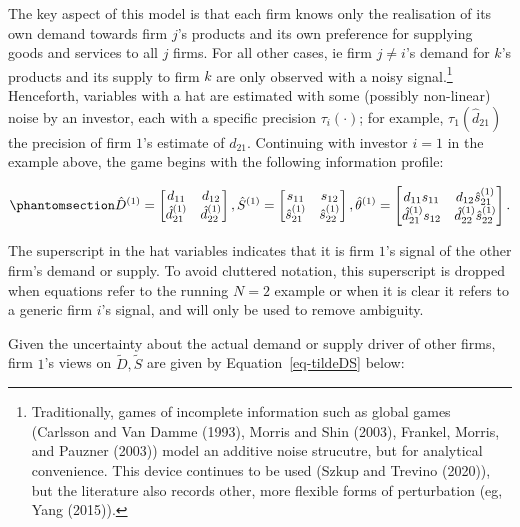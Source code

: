 \documentclass[
]{article}
\theoremstyle{definition}
\theoremstyle{plain}
\theoremstyle{remark}
\begin{document}
The key aspect of this model is that each firm knows only the
realisation of its own demand towards firm \(j\)'s products and its own
preference for supplying goods and services to all \(j\) firms. For all
other cases, ie firm \(j \neq i\)'s demand for \(k\)'s products and its
supply to firm \(k\) are only observed with a noisy signal.\footnote{Traditionally,
  games of incomplete information such as global games (Carlsson and Van
  Damme (1993), Morris and Shin (2003), Frankel, Morris, and Pauzner
  (2003)) model an additive noise strucutre, but for analytical
  convenience. This device continues to be used (Szkup and Trevino
  (2020)), but the literature also records other, more flexible forms of
  perturbation (eg, Yang (2015)).} Henceforth, variables with a hat are
estimated with some (possibly non-linear) noise by an investor, each
with a specific precision \(\tau_i(\cdot)\); for example,
\(\tau_1(\hat{d}_{21})\) the precision of firm \(1\)'s estimate of
\(d_{21}\). Continuing with investor \(i=1\) in the example above, the
game begins with the following information profile:

\begin{equation}\phantomsection\label{eq-DStheta}{
\hat{D}^{(1)} = 
\begin{bmatrix}
d_{11} & d_{12} \\
\hat{d}_{21}^{(1)} & \hat{d}_{22}^{(1)}
\end{bmatrix}
,
\hat{S}^{(1)} = 
\begin{bmatrix}
s_{11} & s_{12} \\
\hat{s}_{21}^{(1)} & \hat{s}_{22}^{(1)}
\end{bmatrix}
,
\hat{\theta}^{(1)} = 
\begin{bmatrix}
d_{11}s_{11} & d_{12}\hat{s}_{21}^{(1)} \\
\hat{d}_{21}^{(1)} s_{12} & \hat{d}_{22}^{(1)} \hat{s}_{22}^{(1)}
\end{bmatrix}.
}\end{equation}

The superscript in the hat variables indicates that it is firm \(1\)'s
signal of the other firm's demand or supply. To avoid cluttered
notation, this superscript is dropped when equations refer to the
running \(N=2\) example or when it is clear it refers to a generic firm
\(i\)'s signal, and will only be used to remove ambiguity.

Given the uncertainty about the actual demand or supply driver of other
firms, firm \(1\)'s views on \(\tilde{D}, \tilde{S}\) are given by
Equation~\ref{eq-tildeDS} below:
\end{document}
